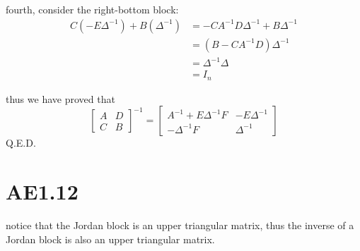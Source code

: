 \documentclass[12pt,a4paper]{article}
\begin{document}
fourth, consider the right-bottom block:
\[
    \begin{aligned}
        C(-E\Delta^{-1}) + B(\Delta^{-1}) & = -CA^{-1}D\Delta^{-1} + B\Delta^{-1} \\
                                          & = (B - CA^{-1}D)\Delta^{-1} \\
                                          & = \Delta^{-1}\Delta \\
                                        & = I_n
    \end{aligned}
\]

thus we have proved that
\[
    \begin{bmatrix}
        A & D \\
        C & B
    \end{bmatrix}^{-1} = \begin{bmatrix}
        A^{-1}+E\Delta^{-1}F & -E\Delta^{-1} \\
        -\Delta^{-1}F & \Delta^{-1}
    \end{bmatrix}
\]
Q.E.D.

\section{AE1.12}
notice that the Jordan block is an upper triangular matrix, 
thus the inverse of a Jordan block is also an upper triangular matrix.
\end{document}
